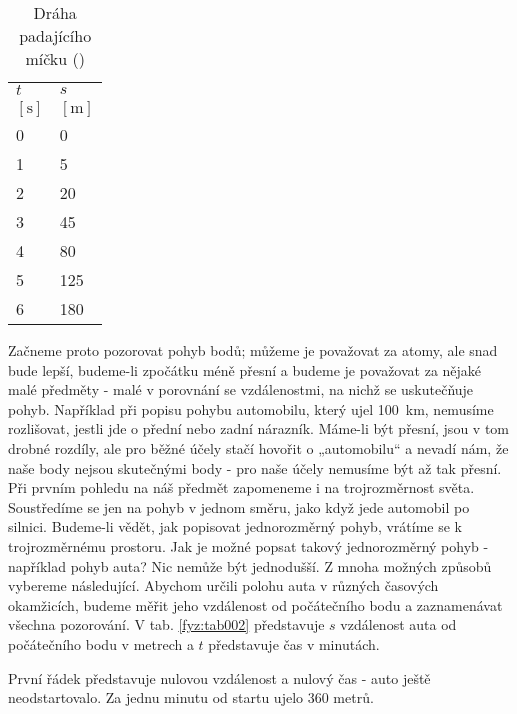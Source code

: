     \begin{table}[ht!]       %
      \centering
      \renewcommand{\arraystretch}{1}
      \begin{tabular}{>{\centering\arraybackslash}p{2em}|>{\centering\arraybackslash}p{3em}}
        \hline  \(t\)    & \(s\)          \\
        \([\text{s}]\)   & \([\text{m}]\)   \\
         \hline  \num{0} & \num{0}          \\
                 \num{1} & \num{5}          \\
                 \num{2} & \num{20}         \\
                 \num{3} & \num{45}         \\
                 \num{4} & \num{80}         \\
                 \num{5} & \num{125}        \\
                 \num{6} & \num{180}        \\
        \hline 
      \end{tabular}
      \caption{Dráha padajícího míčku (\cite[s.~110]{Feynman01})}
      \label{fyz:tab003}
    \end{table}
    Začneme proto pozorovat pohyb bodů; můžeme je považovat za atomy, ale snad bude lepší, 
    budeme-li zpočátku méně přesní a budeme je považovat za nějaké malé předměty - malé v porovnání 
    se vzdálenostmi, na nichž se uskutečňuje pohyb. Například při popisu pohybu automobilu, který 
    ujel \SI{100}{\km}, nemusíme rozlišovat, jestli jde o přední nebo zadní nárazník. Máme-li být 
    přesní, jsou v tom drobné rozdíly, ale pro běžné účely stačí hovořit o „automobilu“ a nevadí 
    nám, že naše body nejsou skutečnými body - pro naše účely nemusíme být až tak přesní. Při 
    prvním pohledu na náš předmět zapomeneme i na trojrozměrnost světa. Soustředíme se jen na pohyb 
    v jednom směru, jako když jede automobil po silnici. Budeme-li vědět, jak popisovat 
    jednorozměrný pohyb, vrátíme se k trojrozměrnému prostoru. Jak je možné popsat takový 
    jednorozměrný pohyb - například pohyb auta? Nic nemůže být jednodušší. Z mnoha možných způsobů 
    vybereme následující. Abychom určili polohu auta v různých časových okamžicích, budeme měřit 
    jeho vzdálenost od počátečního bodu a zaznamenávat všechna pozorování. V tab. \ref{fyz:tab002} 
    představuje \(s\) vzdálenost auta od počátečního bodu v metrech a \(t\) představuje čas v 
    minutách.

    První řádek představuje nulovou vzdálenost a nulový čas - auto ještě neodstartovalo. Za jednu 
    minutu od startu ujelo \num{360} metrů.

